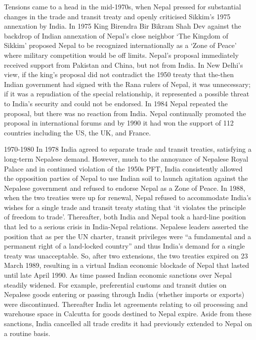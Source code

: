 \documentclass[
  openany]{book}
\begin{document}
Tensions came to a head in the mid-1970s, when Nepal pressed for substantial changes in the trade and transit treaty and openly criticised Sikkim's 1975 annexation by India. In 1975 King Birendra Bir Bikram Shah Dev against the backdrop of Indian annexation of Nepal's close neighbor `The Kingdom of Sikkim' proposed Nepal to be recognized internationally as a `Zone of Peace' where military competition would be off limits. Nepal's proposal immediately received support from Pakistan and China, but not from India. In New Delhi's view, if the king's proposal did not contradict the 1950 treaty that the-then Indian government had signed with the Rana rulers of Nepal, it was unnecessary; if it was a repudiation of the special relationship, it represented a possible threat to India's security and could not be endorsed. In 1984 Nepal repeated the proposal, but there was no reaction from India. Nepal continually promoted the proposal in international forums and by 1990 it had won the support of 112 countries including the US, the UK, and France.

1970-1980
In 1978 India agreed to separate trade and transit treaties, satisfying a long-term Nepalese demand. However, much to the annoyance of Nepalese Royal Palace and in continued violation of the 1950s PFT, India consistently allowed the opposition parties of Nepal to use Indian soil to launch agitation against the Nepalese government and refused to endorse Nepal as a Zone of Peace. In 1988, when the two treaties were up for renewal, Nepal refused to accommodate India's wishes for a single trade and transit treaty stating that `it violates the principle of freedom to trade'. Thereafter, both India and Nepal took a hard-line position that led to a serious crisis in India-Nepal relations. Nepalese leaders asserted the position that as per the UN charter, transit privileges were ``a fundamental and a permanent right of a land-locked country'' and thus India's demand for a single treaty was unacceptable. So, after two extensions, the two treaties expired on 23 March 1989, resulting in a virtual Indian economic blockade of Nepal that lasted until late April 1990. As time passed Indian economic sanctions over Nepal steadily widened. For example, preferential customs and transit duties on Nepalese goods entering or passing through India (whether imports or exports) were discontinued. Thereafter India let agreements relating to oil processing and warehouse space in Calcutta for goods destined to Nepal expire. Aside from these sanctions, India cancelled all trade credits it had previously extended to Nepal on a routine basis.
\end{document}
